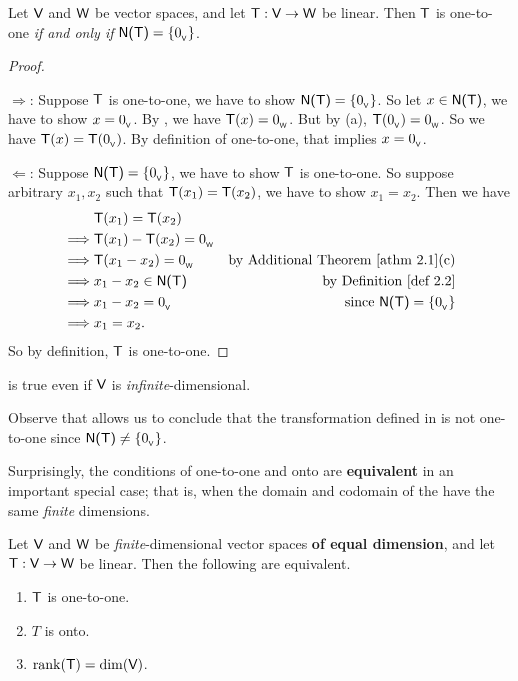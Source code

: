 \begin{theorem} \label{thm 2.4}
Let \(\textsf{V}\) and \(\textsf{W}\) be vector spaces, and let \(\textsf{T} : \textsf{V} \to \textsf{W}\) be linear.
Then \(\textsf{T}\) is one-to-one \emph{if and only if} \(\textsf{N(T)} = \{ 0_{_{\textsf{V}}} \}\).
\end{theorem}

\begin{proof} \ 

\(\Longrightarrow\): Suppose \(\textsf{T}\) is one-to-one, we have to show \(\textsf{N(T)} = \{ 0_{_{\textsf{V}}} \}\).
So let \(x \in \textsf{N(T)}\), we have to show \(x = 0_{_{\textsf{V}}}\).
By , we have \(\textsf{T}(x) = 0_{_{\textsf{W}}}\).
But by (a), \(\textsf{T}(0_{_{\textsf{V}}}) = 0_{_{\textsf{W}}}\).
So we have \(\textsf{T}(x) = \textsf{T}(0_{_{\textsf{V}}})\).
By definition of one-to-one, that implies \(x = 0_{_{\textsf{V}}}\).

\(\Longleftarrow\):
Suppose \(\textsf{N(T)} = \{ 0_{_{\textsf{V}}} \}\), we have to show \(\textsf{T}\) is one-to-one.
So suppose arbitrary \(x_1, x_2\) such that \(\textsf{T}(x_1) = \textsf{T}(x_2)\), we have to show \(x_1 = x_2\).
Then we have
\begin{align*}
             & \T(x_1) = \T(x_2) \\
    \implies & \T(x_1) - \T(x_2) = \OW \\
    \implies & \T(x_1 - x_2) = \OW & \text{by \ATHM{2.1}(c)} \\
    \implies & x_1 - x_2 \in \NULLT & \text{by \DEF{2.2}} \\
    \implies & x_1 - x_2 = \OV & \text{since \(\NULLT = \{ \OV \}\)} \\
    \implies & x_1 = x_2.
\end{align*}
So by definition, \(\textsf{T}\) is one-to-one.
\end{proof}

\begin{remark} \label{remark 2.1.9}
 is true even if \(\textsf{V}\) is \emph{infinite}-dimensional.
\end{remark}

\begin{note}
Observe that  allows us to conclude that the transformation defined in  is not one-to-one since \(\textsf{N(T)} \ne \{ 0_{_{\textsf{V}}} \}\).
\end{note}

Surprisingly, the conditions of one-to-one and onto are \textbf{equivalent} in an important special case; that is, when the domain and codomain of the \LTRAN{} have the same \emph{finite} dimensions.

\begin{theorem} \label{thm 2.5}
Let \(\textsf{V}\) and \(\textsf{W}\) be \emph{finite}-dimensional vector spaces \textbf{of equal dimension}, and let \(\textsf{T} : \textsf{V} \to \textsf{W}\) be linear.
Then the following are equivalent.
\begin{enumerate}
\item \(\textsf{T}\) is one-to-one.
\item \(T\) is onto.
\item \(\mathrm{rank}(\textsf{T}) = \dim(\textsf{V})\).
\end{enumerate}
\end{theorem}

